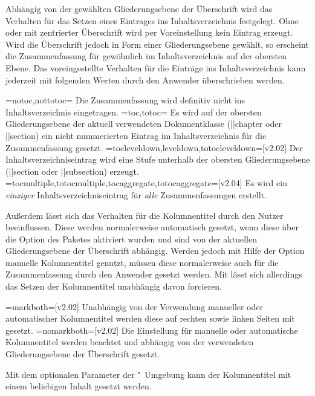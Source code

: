 \begin{DeclareEntity*}{}
\begin{DeclareEntity*}{}
\begin{DeclareEntity*}{}
\begin{Declaration}
Abhängig von der gewählten Gliederungsebene der Überschrift wird das Verhalten 
für das Setzen eines Eintrages ins Inhaltsverzeichnis festgelegt. Ohne oder mit 
zentrierter Überschrift wird per Voreinstellung kein Eintrag erzeugt. Wird die 
Überschrift jedoch in Form einer Gliederungsebene gewählt, so erscheint die 
Zusammenfassung für gewöhnlich im Inhaltsverzeichnis auf der obersten Ebene. 
Das voreingestellte Verhalten für die Einträge ins Inhaltsverzeichnis kann 
jederzeit mit folgenden Werten durch den Anwender überschrieben werden.
\begin{DeclareValues}
\itemval=notoc,nottotoc=
  Die Zusammenfassung wird definitiv nicht ins Inhaltsverzeichnis eingetragen.
\itemval=toc,totoc=
  Es wird auf der obersten Gliederungsebene der aktuell verwendeten 
  Dokumentklasse (\Macro||{chapter} oder \Macro||{section}) ein nicht 
  nummerierten Eintrag im Inhaltsverzeichnis für die Zusammenfassung gesetzt.
\itemval=tocleveldown,leveldown,totocleveldown=[v2.02]
  Der Inhaltsverzeichniseintrag wird eine Stufe unterhalb der obersten 
  Gliederungsebene (\Macro||{section} oder \Macro||{subsection}) erzeugt.
\itemval=tocmultiple,totocmultiple,tocaggregate,totocaggregate=[v2.04]
  Es wird ein \emph{einziger} Inhaltsverzeichniseintrag für \emph{alle} 
  Zusammenfassungen erstellt.
\end{DeclareValues}

Außerdem lässt sich das Verhalten für die Kolumnentitel durch den Nutzer 
beeinflussen. Diese werden normalerweise automatisch gesetzt, wenn diese über 
die Option  des Paketes  aktiviert 
wurden und sind von der aktuellen Gliederungsebene der Überschrift abhängig. 
Werden jedoch mit Hilfe der Option  manuelle Kolumnentitel 
genutzt, müssen diese normalerweise auch für die Zusammenfassung durch den 
Anwender gesetzt werden. Mit  lässt sich allerdings 
das Setzen der Kolumnentitel unabhängig davon forcieren.
\begin{DeclareValues}
\itemval=markboth=[v2.02]
  Unabhängig von der Verwendung manueller oder automatischer Kolumnentitel 
  werden diese auf rechten sowie linken Seiten mit  gesetzt.
\itemval=nomarkboth=[v2.02]
  Die Einstellung für manuelle oder automatische Kolumnentitel werden beachtet 
  und abhängig von der verwendeten Gliederungsebene der Überschrift gesetzt.
\end{DeclareValues}

Mit dem optionalen Parameter  der 
"~Umgebung kann der Kolumnentitel mit einem beliebigen 
Inhalt gesetzt werden.


\end{Declaration}
\end{DeclareEntity*}
\end{DeclareEntity*}
\end{DeclareEntity*}
